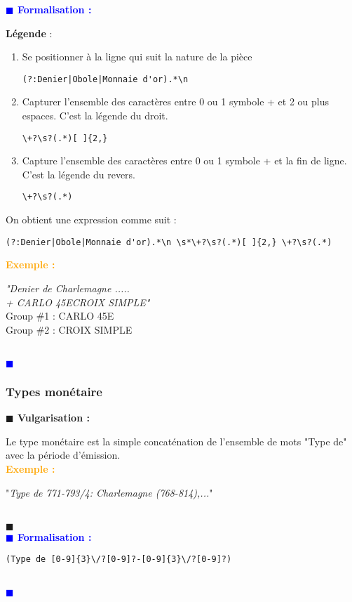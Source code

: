 \documentclass[a4paper, 11pt]{article}
\newenvironment{vulgarisation}
    {
    \textbf{\textcolor{dark-blue}{$\blacksquare$  Vulgarisation : \\}}

    }
    {
    ~\\\textcolor{dark-blue}{$\blacksquare$}\\
    }
\newenvironment{formalisation}
    {
    \textbf{\textcolor{blue}{$\blacksquare$  Formalisation : \\}}
    }
    {
    ~\\\textcolor{blue}{$\blacksquare$}\\
    }
\newenvironment{exemple}
    {
    \textbf{\textcolor{orange}{
    Exemple : \\}}
    }
    {\\
    }
\begin{document}
\begin{formalisation}
	\textbf{Légende} :
	\begin{enumerate}
		\item Se positionner à la ligne qui suit la nature de la pièce
		      \begin{verbatim}
(?:Denier|Obole|Monnaie d'or).*\n
		\end{verbatim}
		\item Capturer l'ensemble des caractères entre 0 ou 1 symbole + et 2 ou plus espaces. C'est la légende du droit.
		      \begin{verbatim}
\+?\s?(.*)[ ]{2,}
		\end{verbatim}
		\item Capture l'ensemble des caractères entre 0 ou 1 symbole + et la fin de ligne. C'est la légende du revers.
		      \begin{verbatim}
\+?\s?(.*)
		\end{verbatim}
	\end{enumerate}
	
	On obtient une expression comme suit : 
	\begin{verbatim}
(?:Denier|Obole|Monnaie d'or).*\n \s*\+?\s?(.*)[ ]{2,} \+?\s?(.*)
	\end{verbatim}
	
	\begin{exemple}
		\emph{"Denier de Charlemagne ..... \\+ CARLO  45E\indent\indent CROIX SIMPLE"}\\
		Group \#1 : CARLO  45E \\
		Group \#2 : CROIX SIMPLE
	\end{exemple}
\end{formalisation}

\subsubsection{Types monétaire}
\begin{vulgarisation}
	Le type monétaire est la simple concaténation de l'ensemble de mots "Type de" avec la période d'émission.\\
	\begin{exemple}
		"\emph{Type de 771-793/4: Charlemagne (768-814),...}"
	\end{exemple}
\end{vulgarisation}
\begin{formalisation}
	\begin{verbatim}
(Type de [0-9]{3}\/?[0-9]?-[0-9]{3}\/?[0-9]?)
	\end{verbatim}
\end{formalisation}
\end{document}

